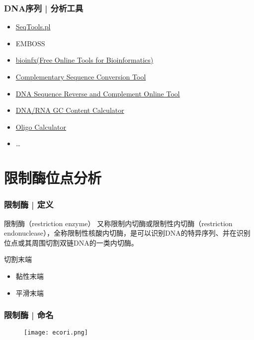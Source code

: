 \begin{frame}
	\frametitle{DNA序列 | 分析工具}
	\begin{itemize}
		\item \href{http://yixf.name/2011/06/01/\%E5\%AF\%B9fasta\%E6\%A0\%BC\%E5\%BC\%8F\%E7\%9A\%84\%E7\%AE\%80\%E5\%8D\%95\%E5\%A4\%84\%E7\%90\%86\%E4\%B8\%8E\%E7\%BB\%9F\%E8\%AE\%A1/}{SeqTools.pl}
		\item EMBOSS
		\item \href{http://bioinfx.net/}{bioinfx(Free Online Tools for Bioinformatics)}
		\item \href{http://clasher.myweb.uga.edu/testpages/seqconv.html}{Complementary Sequence Conversion Tool}
		\item \href{http://www.cellbiol.com/scripts/complement/dna\_sequence\_reverse\_complement.php}{DNA Sequence Reverse and Complement Online Tool}
		\item \href{http://www.endmemo.com/bio/gc.php}{DNA/RNA GC Content Calculator}
		\item \href{http://www.sciencelauncher.com/oligocalc.html}{Oligo Calculator}
		\item \ldots
	\end{itemize}
\end{frame}

\section{限制酶位点分析}
\begin{frame}
	\frametitle{限制酶 | 定义}
	\begin{block}{限制酶（restriction enzyme）}
		又称限制内切酶或限制性内切酶（restriction endonuclease），全称限制性核酸内切酶，是可以识别DNA的特异序列、并在识别位点或其周围切割双链DNA的一类内切酶。
	\end{block}
	\pause
	\begin{block}{切割末端}
		\begin{itemize}
			\item 黏性末端
			\item 平滑末端
		\end{itemize}
	\end{block}
\end{frame}

\begin{frame}
	\frametitle{限制酶 | 命名}
	\begin{figure}
		\centering
		\texttt{[image: ecori.png]}
	\end{figure}
\end{frame}

